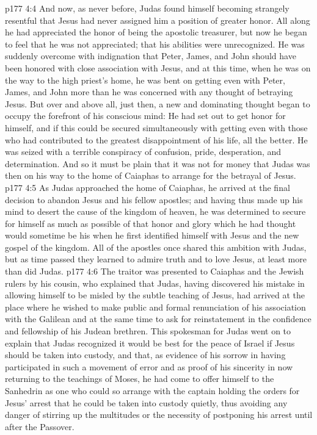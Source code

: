 \vs p177 4:4 And now, as never before, Judas found himself becoming strangely resentful that Jesus had never assigned him a position of greater honor. All along he had appreciated the honor of being the apostolic treasurer, but now he began to feel that he was not appreciated; that his abilities were unrecognized. He was suddenly overcome with indignation that Peter, James, and John should have been honored with close association with Jesus, and at this time, when he was on the way to the high priest’s home, he was bent on getting even with Peter, James, and John more than he was concerned with any thought of betraying Jesus. But over and above all, just then, a new and dominating thought began to occupy the forefront of his conscious mind: He had set out to get honor for himself, and if this could be secured simultaneously with getting even with those who had contributed to the greatest disappointment of his life, all the better. He was seized with a terrible conspiracy of confusion, pride, desperation, and determination. And so it must be plain that it was not for money that Judas was then on his way to the home of Caiaphas to arrange for the betrayal of Jesus.
\vs p177 4:5 As Judas approached the home of Caiaphas, he arrived at the final decision to abandon Jesus and his fellow apostles; and having thus made up his mind to desert the cause of the kingdom of heaven, he was determined to secure for himself as much as possible of that honor and glory which he had thought would sometime be his when he first identified himself with Jesus and the new gospel of the kingdom. All of the apostles once shared this ambition with Judas, but as time passed they learned to admire truth and to love Jesus, at least more than did Judas.
\vs p177 4:6 The traitor was presented to Caiaphas and the Jewish rulers by his cousin, who explained that Judas, having discovered his mistake in allowing himself to be misled by the subtle teaching of Jesus, had arrived at the place where he wished to make public and formal renunciation of his association with the Galilean and at the same time to ask for reinstatement in the confidence and fellowship of his Judean brethren. This spokesman for Judas went on to explain that Judas recognized it would be best for the peace of Israel if Jesus should be taken into custody, and that, as evidence of his sorrow in having participated in such a movement of error and as proof of his sincerity in now returning to the teachings of Moses, he had come to offer himself to the Sanhedrin as one who could so arrange with the captain holding the orders for Jesus’ arrest that he could be taken into custody quietly, thus avoiding any danger of stirring up the multitudes or the necessity of postponing his arrest until after the Passover.
